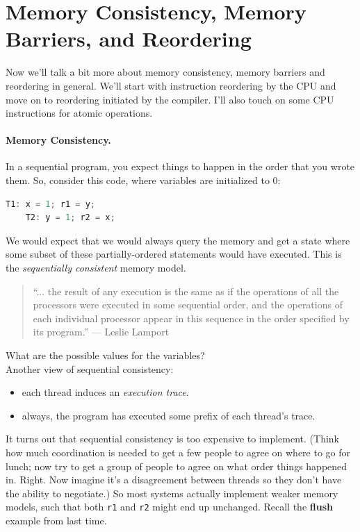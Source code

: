 \documentclass[a4paper]{report}
\begin{document}
\section*{Memory Consistency, Memory Barriers, and Reordering}
Now we'll talk a bit more about memory consistency, memory barriers
and reordering in general. We'll start with instruction reordering by
the CPU and move on to reordering initiated by the compiler.  I'll
also touch on some CPU instructions for atomic operations.

\paragraph{Memory Consistency.} In a sequential program, you expect
things to happen in the order that you wrote them. So, consider this code,
where variables are initialized to 0:

\begin{center}
\begin{lstlisting}[language=C]
    T1: x = 1; r1 = y;
    T2: y = 1; r2 = x;
\end{lstlisting}
\end{center}
We would expect that we would always query the memory and get a state
where some subset of these partially-ordered statements would have executed.
This is the \emph{sequentially consistent} memory model.

\begin{quote}
``... the result of any execution is the same as if the operations of all the processors were executed in some sequential order, and the operations of each individual processor appear in this sequence in the order specified by its program.'' --- Leslie Lamport
\end{quote}

{\sf What are the possible values for the variables?}\\[3em]

Another view of sequential consistency:
\begin{itemize}
      \item each thread induces an \emph{execution trace}.
      \item always, the program has executed some prefix of each thread's
        trace.
\end{itemize}


It turns out that sequential consistency is too expensive to implement.
(Think how much coordination is needed to get a few people to agree on where to go for lunch; now try to get a group of people to agree on what order things happened in. Right. Now imagine it's a disagreement between threads so they don't have the ability to negotiate.) So most systems actually implement weaker memory models,
such that both {\tt r1} and {\tt r2} might end up unchanged. Recall the 
{\bf flush} example from last time.
\end{document}
